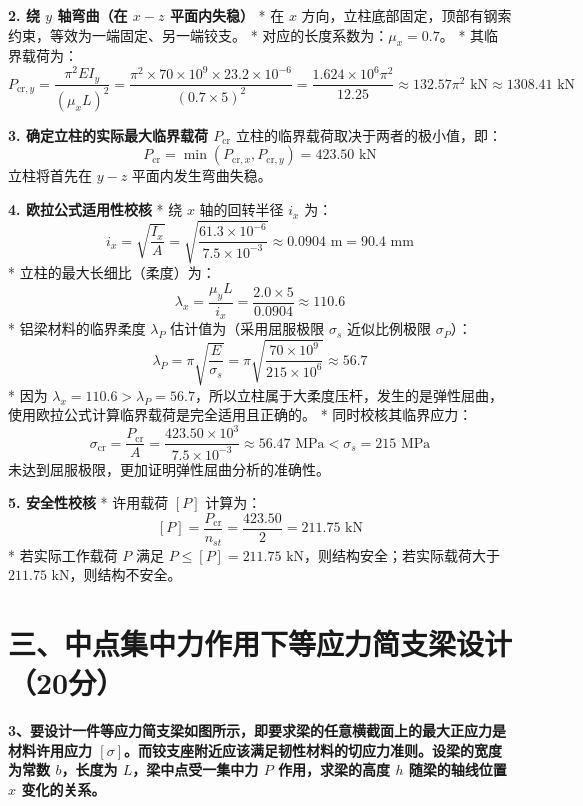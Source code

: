 \documentclass[UTF8,fontset=windows]{ctexart}
\begin{document}
\textbf{2. 绕 $y$ 轴弯曲（在 $x-z$ 平面内失稳）}
*   在 $x$ 方向，立柱底部固定，顶部有钢索约束，等效为一端固定、另一端铰支。
*   对应的长度系数为：$\mu_x = 0.7$。
*   其临界载荷为：
    \[
        P_{\text{cr}, y} = \frac{\pi^2 E I_y}{(\mu_x L)^2} = \frac{\pi^2 \times 70 \times 10^9 \times 23.2 \times 10^{-6}}{(0.7 \times 5)^2} = \frac{1.624 \times 10^6 \pi^2}{12.25} \approx 132.57 \pi^2\text{ kN} \approx 1308.41\text{ kN}
    \]

\textbf{3. 确定立柱的实际最大临界载荷 $P_{\text{cr}}$}
立柱的临界载荷取决于两者的极小值，即：
\[
    P_{\text{cr}} = \min(P_{\text{cr}, x}, P_{\text{cr}, y}) = 423.50\text{ kN}
\]
立柱将首先在 $y-z$ 平面内发生弯曲失稳。

\textbf{4. 欧拉公式适用性校核}
*   绕 $x$ 轴的回转半径 $i_x$ 为：
    \[
        i_x = \sqrt{\frac{I_x}{A}} = \sqrt{\frac{61.3 \times 10^{-6}}{7.5 \times 10^{-3}}} \approx 0.0904\text{ m} = 90.4\text{ mm}
    \]
*   立柱的最大长细比（柔度）为：
    \[
        \lambda_x = \frac{\mu_y L}{i_x} = \frac{2.0 \times 5}{0.0904} \approx 110.6
    \]
*   铝梁材料的临界柔度 $\lambda_P$ 估计值为（采用屈服极限 $\sigma_s$ 近似比例极限 $\sigma_P$）：
    \[
        \lambda_P = \pi \sqrt{\frac{E}{\sigma_s}} = \pi \sqrt{\frac{70 \times 10^9}{215 \times 10^6}} \approx 56.7
    \]
*   因为 $\lambda_x = 110.6 > \lambda_P = 56.7$，所以立柱属于大柔度压杆，发生的是弹性屈曲，使用欧拉公式计算临界载荷是完全适用且正确的。
*   同时校核其临界应力：
    \[
        \sigma_{\text{cr}} = \frac{P_{\text{cr}}}{A} = \frac{423.50 \times 10^3}{7.5 \times 10^{-3}} \approx 56.47\text{ MPa} < \sigma_s = 215\text{ MPa}
    \]
    未达到屈服极限，更加证明弹性屈曲分析的准确性。

\textbf{5. 安全性校核}
*   许用载荷 $[P]$ 计算为：
    \[
        [P] = \frac{P_{\text{cr}}}{n_{st}} = \frac{423.50}{2} = 211.75\text{ kN}
    \]
*   若实际工作载荷 $P$ 满足 $P \le [P] = 211.75\text{ kN}$，则结构安全；若实际载荷大于 $211.75\text{ kN}$，则结构不安全。

\newpage

\section*{三、中点集中力作用下等应力简支梁设计（20分）}

\textbf{3、要设计一件等应力简支梁如图所示，即要求梁的任意横截面上的最大正应力是材料许用应力 $[\sigma]$。而铰支座附近应该满足韧性材料的切应力准则。设梁的宽度为常数 $b$，长度为 $L$，梁中点受一集中力 $P$ 作用，求梁的高度 $h$ 随梁的轴线位置 $x$ 变化的关系。}
\end{document}
